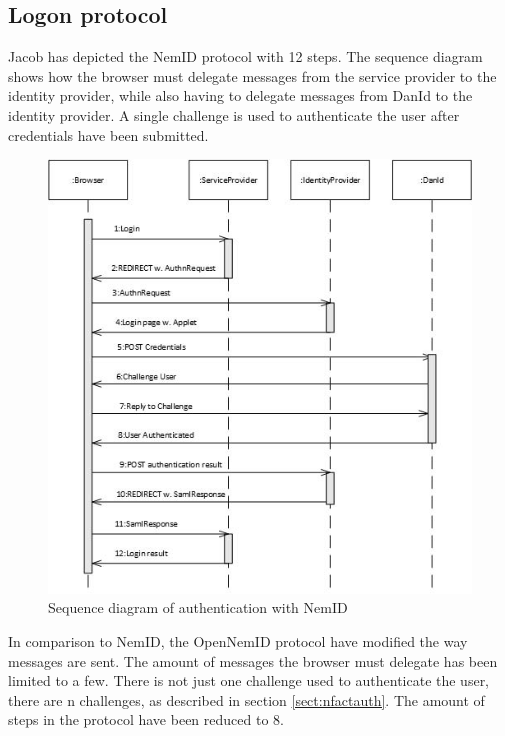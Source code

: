 \documentclass[twosided]{report}
\begin{document}
\subsection{Logon protocol}
Jacob has depicted the NemID protocol with 12 steps. The sequence diagram shows how the browser must delegate messages from the service provider to the identity provider, while also having to delegate messages from DanId to the identity provider. A single challenge is used to authenticate the user after credentials have been submitted.

\begin{figure}[H]
	\centering
	\includegraphics{images/Sequence-login-Jacob.jpg}
	\caption[Sequence diagram of authentication with NemID]{Sequence diagram of authentication with NemID \cite{jacob}}
\end{figure}

In comparison to NemID, the OpenNemID protocol have modified the way messages are sent. The amount of messages the browser must delegate has been limited to a few. There is not just one challenge used to authenticate the user, there are n challenges, as described in section \ref{sect:nfactauth}. The amount of steps in the protocol have been reduced to 8.
\end{document}
